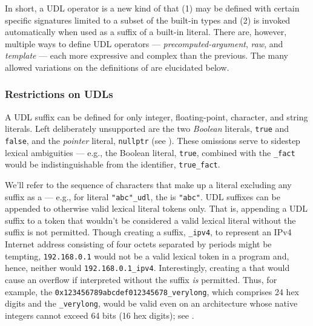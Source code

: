 \noindent In short, a UDL operator is a new kind of  that
(1) may be defined with certain specific signatures limited to a subset
of the built-in types and (2) is invoked automatically when used as a
suffix of a built-in literal. There are, however, multiple ways to
define UDL operators --- \emph{precomputed-argument}, \emph{raw}, and
\emph{template} --- each more expressive and complex than the previous.
The many allowed variations on the definitions of 
are elucidated below.

\subsubsection[Restrictions on UDLs]{Restrictions on UDLs}\label{restrictions-on-user-defined-literals-(udls)}

A UDL suffix can be defined for only integer, floating-point, character,
and string literals. Left deliberately unsupported are the two
\emph{Boolean} literals, \lstinline!true! and \lstinline!false!, and the
\emph{pointer} literal, \lstinline!nullptr! (see ). These omissions serve to sidestep
lexical ambiguities --- e.g., the Boolean literal, \lstinline!true!,
combined with the  \lstinline!_fact! would be
indistinguishable from the identifier, \lstinline!true_fact!.

We'll refer to the sequence of characters that make up a literal
excluding any suffix as a  --- e.g., for literal
\lstinline!"abc"_udl!, the  is \lstinline!"abc"!. UDL
suffixes can be appended to otherwise valid lexical literal tokens only.
That is, appending a UDL suffix to a token that
wouldn't be considered a valid lexical literal without the suffix is not permitted.
Though creating a suffix, \lstinline!_ipv4!, to
represent an IPv4 Internet address consisting of four octets separated
by periods might be tempting, \lstinline!192.168.0.1! would not be a valid lexical token in a
program and, hence, neither would \lstinline!192.168.0.1_ipv4!.
Interestingly, creating a  that
would cause an overflow if interpreted without the suffix \emph{is} permitted. Thus, for
example, the  \lstinline!0x123456789abcdef012345678_verylong!,
which comprises 24 hex digits and the 
\lstinline!_verylong!, would be valid even on an architecture whose native
integers cannot exceed 64 bits (16 hex digits); see .

